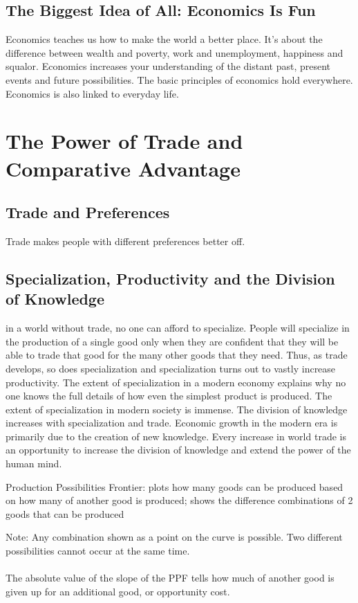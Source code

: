 \documentclass[12pt]{article}
\begin{document}
\subsection{The Biggest Idea of All: Economics Is Fun} 
Economics teaches us how to make the world a better place. It's about the difference between wealth and poverty, work and unemployment, happiness and squalor. Economics increases your understanding of the distant past, present events and future possibilities. The basic principles of economics hold everywhere. Economics is also linked to everyday life. 


\section{The Power of Trade and Comparative Advantage} 
\subsection{Trade and Preferences} 
Trade makes people with different preferences better off. 

\subsection{Specialization, Productivity and the Division of Knowledge} 
in a world without trade, no one can afford to specialize. People will specialize in the production of a single good only when they are confident that they will be able to trade that good for the many other goods that they need. Thus, as trade develops, so does specialization and specialization turns out to vastly increase productivity. The extent of specialization in a modern economy explains why no one knows the full details of how even the simplest product is produced. The extent of specialization in modern society is immense. The division of knowledge increases with specialization and trade. Economic growth in the modern era is primarily due to the creation of new knowledge. Every increase in world trade is an opportunity to increase the division of knowledge and extend the power of the human mind. 

\begin{definition} Production Possibilities Frontier: plots how many goods can be produced based on how many of another good is produced; shows the difference combinations of 2 goods that can be produced \end{definition}
Note: Any combination shown as a point on the curve is possible. Two different possibilities cannot occur at the same time. \\~\\
The absolute value of the slope of the PPF tells how much of another good is given up for an additional good, or opportunity cost. 
\end{document}
